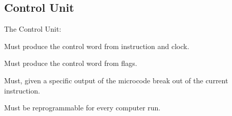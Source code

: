 \subsection{Control Unit}

The Control Unit:
\begin{arch-requirement}
  Must produce the control word from instruction and clock.
\end{arch-requirement}

\begin{turing-requirement}
  Must produce the control word from flags.
\end{turing-requirement}

\begin{feat-requirement}
  Must, given a specific output of the microcode break out of the current instruction. 
\end{feat-requirement}

\begin{feat-requirement}
  Must be reprogrammable for every computer run.
\end{feat-requirement}


